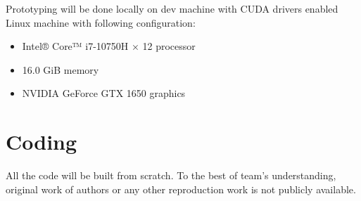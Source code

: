 \documentclass[11pt,a4paper]{article}
\begin{document}
Prototyping will be done locally on dev machine with CUDA drivers enabled Linux machine with following configuration:
\begin{itemize}
    \item Intel® Core™ i7-10750H × 12 processor
    \item 16.0 GiB memory
    \item NVIDIA GeForce GTX 1650 graphics
\end{itemize}

\section{Coding}
All the code will be built from scratch. To the best of team's understanding, original work of authors or any other reproduction work is not publicly available.





\end{document}
